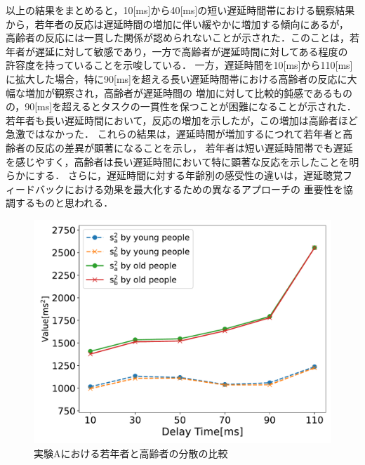 以上の結果をまとめると，10[ms]から40[ms]の短い遅延時間帯における観察結果から，若年者の反応は遅延時間の増加に伴い緩やかに増加する傾向にあるが，
高齢者の反応には一貫した関係が認められないことが示された．このことは，若年者が遅延に対して敏感であり，一方で高齢者が遅延時間に対してある程度の
許容度を持っていることを示唆している．
一方，遅延時間を10[ms]から110[ms]に拡大した場合，特に90[ms]を超える長い遅延時間帯における高齢者の反応に大幅な増加が観察され，高齢者が遅延時間の
増加に対して比較的鈍感であるものの，90[ms]を超えるとタスクの一貫性を保つことが困難になることが示された．
若年者も長い遅延時間において，反応の増加を示したが，この増加は高齢者ほど急激ではなかった．
これらの結果は，遅延時間が増加するにつれて若年者と高齢者の反応の差異が顕著になることを示し，
若年者は短い遅延時間帯でも遅延を感じやすく，高齢者は長い遅延時間において特に顕著な反応を示したことを明らかにする．
さらに，遅延時間に対する年齢別の感受性の違いは，遅延聴覚フィードバックにおける効果を最大化するための異なるアプローチの
重要性を協調するものと思われる．
\begin{figure}[tbp]
  \centering
  \includegraphics[scale=0.5]{figures/Honbann/Comparison_young_old/110_var_SaSb.pdf}
  \caption{実験Aにおける若年者と高齢者の分散の比較}
  \label{fig:Var_110ms_Sa_Sb}
\end{figure}

